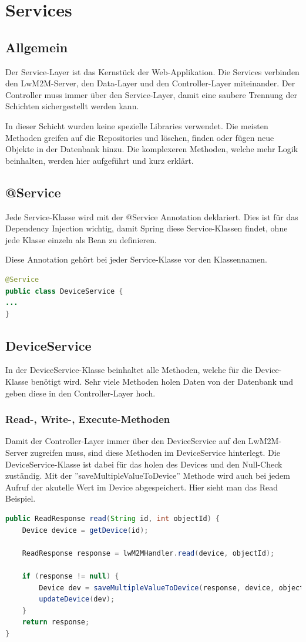 \newpage

\section{Services}
\subsection{Allgemein}
Der Service-Layer ist das Kernstück der Web-Applikation. Die Services verbinden den LwM2M-Server, den Data-Layer und den Controller-Layer miteinander. Der Controller muss immer über den Service-Layer, damit eine saubere Trennung der Schichten sichergestellt werden kann.

In dieser Schicht wurden keine spezielle Libraries verwendet. Die meisten Methoden greifen auf die Repositories und löschen, finden oder fügen neue Objekte in der Datenbank hinzu. Die komplexeren Methoden, welche mehr Logik beinhalten, werden hier aufgeführt und kurz erklärt. 

\subsection{@Service}
Jede Service-Klasse wird mit der @Service Annotation deklariert. Dies ist für das Dependency Injection wichtig, damit Spring diese Service-Klassen findet, ohne jede Klasse einzeln als Bean zu definieren.

Diese Annotation gehört bei jeder Service-Klasse vor den Klassennamen.
\begin{lstlisting}[language=java]
@Service
public class DeviceService {
...
}
\end{lstlisting}
\subsection{DeviceService}
In der DeviceService-Klasse beinhaltet alle Methoden, welche für die Device-Klasse benötigt wird. Sehr viele Methoden holen Daten von der Datenbank und geben diese in den Controller-Layer hoch.
\subsubsection{Read-, Write-, Execute-Methoden}
Damit der Controller-Layer immer über den DeviceService auf den LwM2M-Server zugreifen muss, sind diese Methoden im DeviceService hinterlegt. Die DeviceService-Klasse ist dabei für das holen des Devices und den Null-Check zuständig. Mit der ''saveMultipleValueToDevice'' Methode wird auch bei jedem Aufruf der akutelle Wert im Device abgespeichert. Hier sieht man das Read Beispiel.
\begin{lstlisting}[language=java]
public ReadResponse read(String id, int objectId) {
	Device device = getDevice(id);

	ReadResponse response = lwM2MHandler.read(device, objectId);

	if (response != null) {
		Device dev = saveMultipleValueToDevice(response, device, objectId);
		updateDevice(dev);
	}
	return response;
}
\end{lstlisting}

